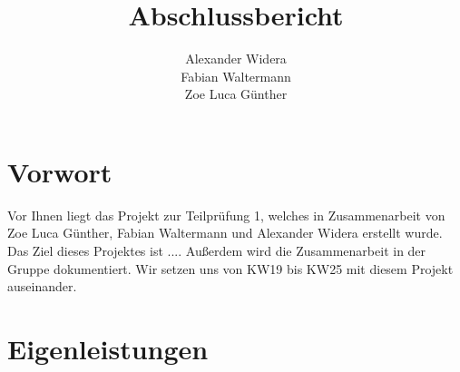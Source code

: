 \documentclass[a4paper,12pt]{scrartcl}
\title {\textbf{Abschlussbericht}}
\author{Alexander Widera \\ Fabian Waltermann \\ Zoe Luca Günther}
\begin{document}
\maketitle
\newpage
\tableofcontents
\newpage
{}

\section{Vorwort}
Vor Ihnen liegt das Projekt zur Teilprüfung 1, welches in Zusammenarbeit von Zoe
Luca Günther, Fabian Waltermann und Alexander Widera erstellt wurde. Das Ziel dieses
Projektes ist .... Außerdem wird die Zusammenarbeit in der Gruppe dokumentiert.
Wir setzen uns von KW19 bis KW25 mit diesem Projekt auseinander.

\section{Eigenleistungen}
\end{document}
